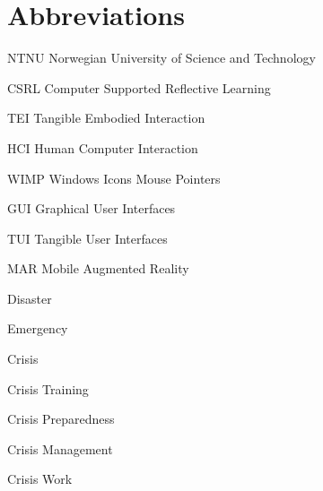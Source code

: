 \chapter{Abbreviations}\label{abbreviations}

NTNU Norwegian University of Science and Technology

CSRL Computer Supported Reflective Learning

TEI Tangible Embodied Interaction

HCI Human Computer Interaction

WIMP Windows Icons Mouse Pointers

GUI Graphical User Interfaces

TUI Tangible User Interfaces

MAR Mobile Augmented Reality

Disaster

Emergency

Crisis

Crisis Training

Crisis Preparedness

Crisis Management

Crisis Work
